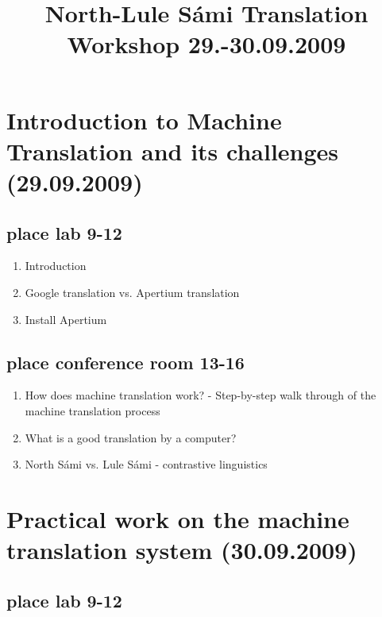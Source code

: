 \documentclass[a4paper,english,12pt]{article}
\begin{document}
\setcounter{secnumdepth}{3}
\setcounter{tocdepth}{3}
\begin{spacing}{1.0}


\newcommand{\tx}{\mbox{t\hspace{-.35em}-}} %




\title{{\Large North-Lule Sámi Translation Workshop 29.-30.09.2009}}

\maketitle

\section{Introduction to Machine Translation and its challenges (29.09.2009)}


\subsection{place lab 9-12}
\begin{enumerate}
\item Introduction
\item Google translation vs. Apertium translation
\item Install Apertium %
\end{enumerate}

\subsection{place conference room 13-16}

\begin{enumerate}
\item How does machine translation work? - Step-by-step walk through of the machine translation process%
\item What is a good translation by a computer?
\item North Sámi vs. Lule Sámi - contrastive linguistics
\end{enumerate}


\section{Practical work on the machine translation system (30.09.2009)}

\subsection{place lab 9-12}


\end{spacing}
\end{document}
